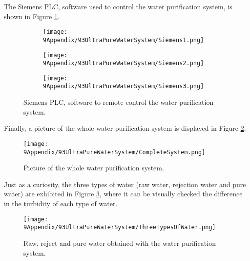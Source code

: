 The Siemens PLC, software used to control the water purification system, is shown in Figure \ref{fig:Siemens}.

\begin{figure}
\centering
    \begin{subfigure}[b]{0.37\textwidth}
    \centering
    \texttt{[image: 9Appendix/93UltraPureWaterSystem/Siemens1.png]}  
    \caption{}
    \end{subfigure}
    \hfill
    \begin{subfigure}[b]{0.3\textwidth}
    \centering
    \texttt{[image: 9Appendix/93UltraPureWaterSystem/Siemens2.png]}  
    \caption{}
    \end{subfigure}
    \hfill
    \begin{subfigure}[b]{0.27\textwidth}
    \centering
    \texttt{[image: 9Appendix/93UltraPureWaterSystem/Siemens3.png]}  
    \caption{}
    \end{subfigure}
 \caption{Siemens PLC, software to remote control the water purification system.}
 \label{fig:Siemens}
\end{figure}

Finally, a picture of the whole water purification system is displayed in Figure \ref{fig:CompleteSystem}.

\begin{figure}[htbp]
\centering
\texttt{[image: 9Appendix/93UltraPureWaterSystem/CompleteSystem.png]}
\caption{Picture of the whole water purification system.\label{fig:CompleteSystem}}
\end{figure}

Just as a curiosity, the three types of water (raw water, rejection water and pure water) are exhibited in Figure \ref{fig:ThreeTypesOfWater}, where it can be visually checked the difference in the turbidity of each type of water.

\begin{figure}[htbp]
\centering
\texttt{[image: 9Appendix/93UltraPureWaterSystem/ThreeTypesOfWater.png]}
\caption{Raw, reject and pure water obtained with the water purification system.\label{fig:ThreeTypesOfWater}}
\end{figure}